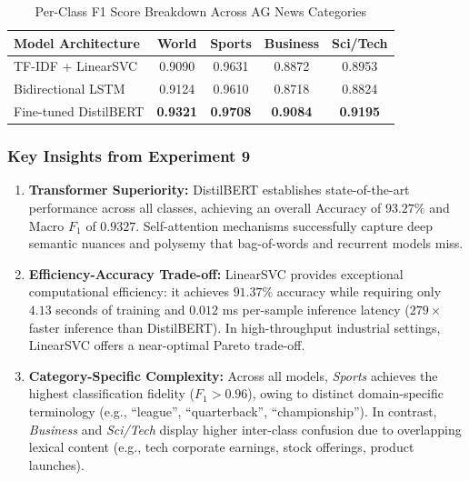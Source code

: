 \documentclass[12pt,a4paper]{report}
\begin{document}
\begin{table}[H]
\centering
\caption{Per-Class F1 Score Breakdown Across AG News Categories}
\label{tab:exp9_class_f1}
\begin{tabular}{lcccc}
\toprule
\textbf{Model Architecture} & \textbf{World} & \textbf{Sports} & \textbf{Business} & \textbf{Sci/Tech} \\
\midrule
TF-IDF + LinearSVC & 0.9090 & 0.9631 & 0.8872 & 0.8953 \\
Bidirectional LSTM & 0.9124 & 0.9610 & 0.8718 & 0.8824 \\
Fine-tuned DistilBERT & \textbf{0.9321} & \textbf{0.9708} & \textbf{0.9084} & \textbf{0.9195} \\
\bottomrule
\end{tabular}
\end{table}

\subsubsection{Key Insights from Experiment 9}
\begin{enumerate}
    \item \textbf{Transformer Superiority:} DistilBERT establishes state-of-the-art performance across all classes, achieving an overall Accuracy of $\mathbf{93.27\%}$ and Macro $F_1$ of $\mathbf{0.9327}$. Self-attention mechanisms successfully capture deep semantic nuances and polysemy that bag-of-words and recurrent models miss.
    \item \textbf{Efficiency-Accuracy Trade-off:} LinearSVC provides exceptional computational efficiency: it achieves $\mathbf{91.37\%}$ accuracy while requiring only $\mathbf{4.13}$ seconds of training and $\mathbf{0.012}$ ms per-sample inference latency ($279\times$ faster inference than DistilBERT). In high-throughput industrial settings, LinearSVC offers a near-optimal Pareto trade-off.
    \item \textbf{Category-Specific Complexity:} Across all models, \textit{Sports} achieves the highest classification fidelity ($F_1 > 0.96$), owing to distinct domain-specific terminology (e.g., ``league'', ``quarterback'', ``championship''). In contrast, \textit{Business} and \textit{Sci/Tech} display higher inter-class confusion due to overlapping lexical content (e.g., tech corporate earnings, stock offerings, product launches).
\end{enumerate}

\end{document}

